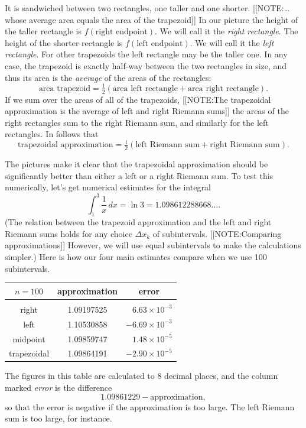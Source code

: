 It is sandwiched between  two rectangles, one taller and one shorter.  
[[NOTE:\ldots whose average area equals the area of the trapezoid]]
In our picture the height of the taller rectangle is $f(\mbox{right
  endpoint})$.  We will call it the {\em right rectangle\/}. The
height of the shorter rectangle is $f(\mbox{left endpoint})$.  We will
call it the {\em left rectangle\/}.  For other trapezoids the left
rectangle may be the taller one.  In any case, the trapezoid is
exactly half-way between the two rectangles in size, and thus its area
is the {\em average\/} of the areas of the rectangles:
	\[
\mbox{area trapezoid} = \tfrac{1}{2} \left( 
		\mbox{area left rectangle} + \mbox{area right rectangle}
		\right).
\]
If we sum over the areas of all of the trapezoids, 
[[NOTE:The trapezoidal approximation is the average of left and right Riemann sums]] 
the areas of the right rectangles sum to the right Riemann sum, and
similarly for the left rectangles.  In follows that  
\[
\mbox{trapezoidal approximation}
  = \tfrac{1}{2}( \mbox{left Riemann sum} + 
			\mbox{right Riemann sum}).
\]

The pictures make it clear that the trapezoidal approximation should
be significantly better than either a left or a right Riemann sum.  To
test this numerically, let's get numerical estimates for the integral
	\[
\int_1^3 \dfrac{1}{x}\,dx = \ln{3} = 1.098612288668\ldots .
\]
(The relation between the trapezoid approximation and the left and
right Riemann sums holds for any choice $\Delta x_k$ of subintervals.
[[NOTE:Comparing approximations]] However, we will use equal subintervals
to make the calculations simpler.)  Here is how our four main
estimates compare when we use 100 subintervals.  \label{trap}
\begin{center}


\begin{tabular}{ccr}
	$n = 100$ & approximation & \multicolumn{1}{c}{error} \\ [2pt]
	\hline \\ [-9pt]
	right & 1.09197525 & $6.63\times10^{-3}$\\
	left & 1.10530858 & $-6.69\times10^{-3}$\\
	midpoint & 1.09859747 & $1.48\times10^{-5}$\\
	trapezoidal & 1.09864191 & $-2.90\times10^{-5}$
\end{tabular}

\end{center}
The figures in this table are calculated to 8 decimal places, and the
column marked {\em error\/} is the difference
	\[
1.09861229 - \mbox{approximation},
\]
so that the error is negative if the approximation is too large.  The
left Riemann sum is too large, for instance.

